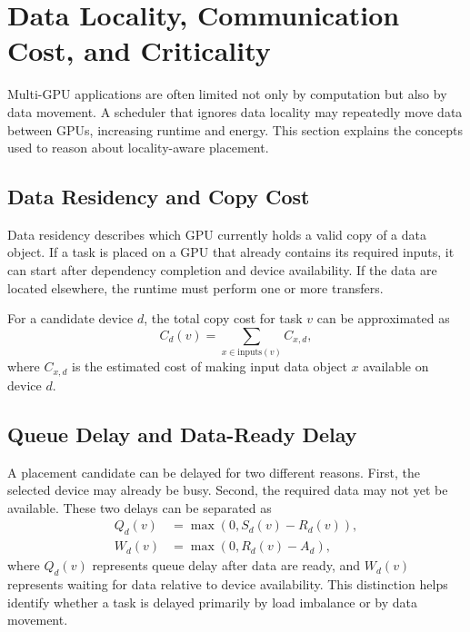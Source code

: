 \section{Data Locality, Communication Cost, and Criticality}
\label{sec:theory_data_locality}

Multi-GPU applications are often limited not only by computation but also by data movement. A scheduler that ignores data locality may repeatedly move data between GPUs, increasing runtime and energy. This section explains the concepts used to reason about locality-aware placement.

\subsection{Data Residency and Copy Cost}
\label{subsec:data_residency_copy_cost}

Data residency describes which GPU currently holds a valid copy of a data object. If a task is placed on a GPU that already contains its required inputs, it can start after dependency completion and device availability. If the data are located elsewhere, the runtime must perform one or more transfers.

For a candidate device $d$, the total copy cost for task $v$ can be approximated as
\begin{equation}
C_d(v) = \sum_{x \in \mathrm{inputs}(v)} C_{x,d},
\label{eq:copy_cost}
\end{equation}
where $C_{x,d}$ is the estimated cost of making input data object $x$ available on device $d$.

\subsection{Queue Delay and Data-Ready Delay}
\label{subsec:queue_data_delay}

A placement candidate can be delayed for two different reasons. First, the selected device may already be busy. Second, the required data may not yet be available. These two delays can be separated as
\begin{align}
Q_d(v) &= \max\left(0, S_d(v) - R_d(v)\right), \\
W_d(v) &= \max\left(0, R_d(v) - A_d\right),
\end{align}
where $Q_d(v)$ represents queue delay after data are ready, and $W_d(v)$ represents waiting for data relative to device availability. This distinction helps identify whether a task is delayed primarily by load imbalance or by data movement.

